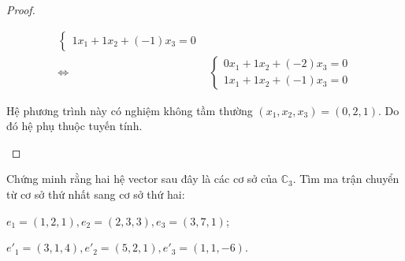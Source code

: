 \documentclass[class=linearalgebra,crop=false]{standalone}
\begin{document}
\begin{proof}
\begin{enumerate}[label = (\alph*)]
\begin{align*}
\begin{cases}
                      1x_{1} + 1x_{2} + (-1)x_{3} = 0
                  \end{cases}                           \\
                  \Leftrightarrow\quad &
                  \begin{cases}
                      0x_{1} + 1x_{2} + (-2)x_{3} = 0 \\
                      1x_{1} + 1x_{2} + (-1)x_{3} = 0
                  \end{cases}
              \end{align*}
              \par Hệ phương trình này có nghiệm không tầm thường $(x_{1}, x_{2}, x_{3}) = (0, 2, 1)$. Do đó hệ phụ thuộc tuyến tính.
    \end{enumerate}
\end{proof}

\begin{exercise}Chứng minh rằng hai hệ vector sau đây là các cơ sở của $\mathbb{C}_{3}$. Tìm ma trận chuyển từ cơ sở thứ nhất sang cơ sở thứ hai:
    \par $e_{1} = (1, 2, 1), e_{2} = (2, 3, 3), e_{3} = (3, 7, 1)$;
    \par $e'_{1} = (3, 1, 4), e'_{2} = (5, 2, 1), e'_{3} = (1, 1, -6)$.
\end{exercise}
\end{document}
